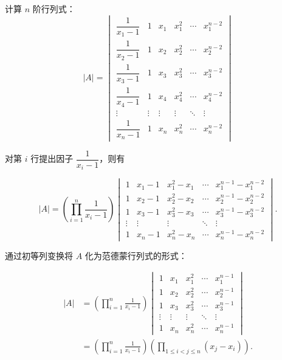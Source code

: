 \begin{example}{}{}
    计算 $n$ 阶行列式：
    \[
        |A| = \begin{vmatrix}
            \dfrac{1}{x_1 - 1} & 1      & x_1    & x_1^2  & \cdots & x_1^{n-2} \\[1.2em]
            \dfrac{1}{x_2 - 1} & 1      & x_2    & x_2^2  & \cdots & x_2^{n-2} \\[1.2em]
            \dfrac{1}{x_3 - 1} & 1      & x_3    & x_3^2  & \cdots & x_3^{n-2} \\[1.2em]
            \dfrac{1}{x_4 - 1} & 1      & x_4    & x_4^2  & \cdots & x_4^{n-2} \\[1.2em]
            \vdots            & \vdots & \vdots & \vdots & \ddots & \vdots    \\[1.2em]
            \dfrac{1}{x_n - 1} & 1      & x_n    & x_n^2  & \cdots & x_n^{n-2}

        \end{vmatrix}
    \]
\end{example}

\begin{solution}
    对第 $i$ 行提出因子 $\dfrac{1}{x_i-1}$，则有

    \[
        |A| = \left(\displaystyle\prod_{i=1}^n \frac{1}{x_i-1} \right) \begin{vmatrix}
            1 & x_1 - 1 & x_1^2 - x_1 & \cdots & x_1^{n-1} - x_1^{n-2} \\
            1 & x_2 - 1 & x_2^2 - x_2 & \cdots & x_2^{n-1} - x_2^{n-2} \\
            1 & x_3 - 1 & x_3^2 - x_3 & \cdots & x_3^{n-1} - x_3^{n-2} \\
            \vdots & \vdots & \vdots & \ddots & \vdots \\
            1 & x_n - 1 & x_n^2 - x_n & \cdots & x_n^{n-1} - x_n^{n-2}
        \end{vmatrix}.
    \]

    通过初等列变换将 $A$ 化为范德蒙行列式的形式：

    \begin{align*}
        |A| &= \left(\displaystyle\prod_{i=1}^n \frac{1}{x_i-1} \right) \begin{vmatrix}
            1 & x_1 & x_1^2 & \cdots & x_1^{n-1} \\
            1 & x_2 & x_2^2 & \cdots & x_2^{n-1} \\
            1 & x_3 & x_3^2 & \cdots & x_3^{n-1} \\
            \vdots & \vdots & \vdots & \ddots & \vdots \\
            1 & x_n & x_n^2 & \cdots & x_n^{n-1}
        \end{vmatrix} \\
        &= \left(\displaystyle\prod_{i=1}^n \frac{1}{x_i-1} \right)
           \left(\displaystyle\prod_{1 \leqslant i < j \leqslant n} (x_j - x_i)\right).
    \end{align*}
\end{solution}

